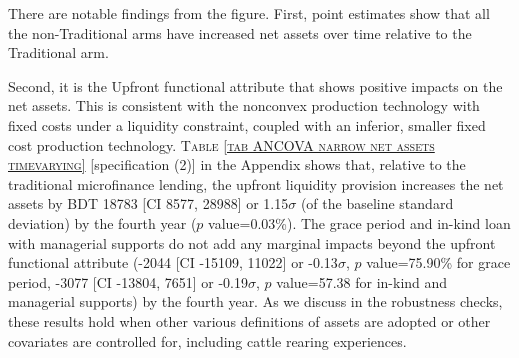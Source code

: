	There are notable findings from the figure. First, point estimates show that all the non-\textsf{Traditional} arms have increased net assets over time relative to the \textsf{Traditional} arm. 


Second, it is the \textsf{Upfront} functional attribute that shows positive impacts on the net assets. This is consistent with the nonconvex production technology with fixed costs under a liquidity constraint, coupled with an inferior, smaller fixed cost production technology. \textsc{\normalsize Table \ref{tab ANCOVA narrow net assets timevarying}} [specification (2)] in the Appendix shows that, relative to the traditional microfinance lending, the upfront liquidity provision increases the net assets by BDT 
	18783 
	[CI 8577, 28988] or 1.15$\sigma$ (of the baseline standard deviation) by the fourth year ($p$ value=0.03\%). The grace period and in-kind loan with managerial supports do not add any marginal impacts beyond the upfront functional attribute 
(-2044 [CI -15109, 11022] or -0.13$\sigma$, $p$ value=75.90\% for grace period, 
-3077 [CI -13804, 7651] or -0.19$\sigma$, $p$ value=57.38 for in-kind and managerial supports) 
by the fourth year. 
	As we discuss in the robustness checks, these results hold when other various definitions of assets are adopted or other covariates are controlled for, including cattle rearing experiences.

